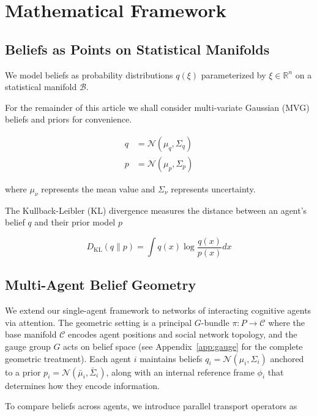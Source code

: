 \documentclass[12pt]{article}
\begin{document}
\section{Mathematical Framework}

\subsection{Beliefs as Points on Statistical Manifolds}

We model beliefs as probability distributions $q(\xi)$ parameterized by $\xi \in \mathbb{R}^n$ on a statistical manifold $\mathcal{B}$. 

For the remainder of this article we shall consider multi-variate Gaussian (MVG) beliefs and priors for convenience.


\begin{align}
q &= \mathcal{N}(\mu_q, \Sigma_q) \\
p &= \mathcal{N}(\mu_p, \Sigma_p)
\end{align}

where $\mu_\nu$ represents the mean value and $\Sigma_\nu$ represents uncertainty.

The Kullback-Leibler (KL) divergence measures the distance between an agent's belief $q$ and their prior model $p$

\begin{equation}
D_{\mathrm{KL}}(q \| p) = \int q(x) \log \frac{q(x)}{p(x)} dx
\end{equation}



\subsection{Multi-Agent Belief Geometry}

We extend our single-agent framework to networks of interacting cognitive agents via attention. The geometric setting is a principal $G$-bundle $\pi: P \to \mathcal{C}$ where the base manifold $\mathcal{C}$ encodes agent positions and social network topology, and the gauge group $G$ acts on belief space (see Appendix~\ref{app:gauge} for the complete geometric treatment). Each agent $i$ maintains beliefs $q_i = \mathcal{N}(\mu_i, \Sigma_i)$ anchored to a prior $p_i = \mathcal{N}(\bar{\mu}_i, \bar{\Sigma}_i)$, along with an internal reference frame $\phi_i$ that determines how they encode information.

To compare beliefs across agents, we introduce parallel transport operators as
\end{document}
